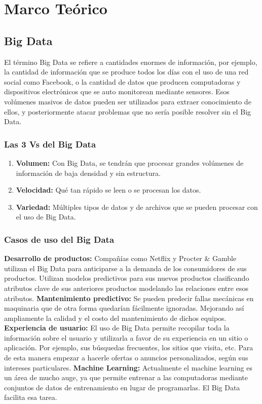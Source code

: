 \hypertarget{seccion:IniciarSesion}{\vspace{1pt}}
\section{Marco Teórico}

\subsection{Big Data}
El término Big Data se refiere a cantidades enormes de información, por ejemplo, la cantidad de información que se produce todos los días con el uso de una red social como Facebook, o la cantidad de datos que producen computadoras y dispositivos electrónicos que se auto monitorean mediante sensores. Esos volúmenes masivos de datos pueden ser utilizados para extraer conocimiento de ellos, y posteriormente atacar problemas que no sería posible resolver sin el Big Data.

\subsubsection{Las 3 Vs del Big Data}

\begin{enumerate}
	\item \textbf{Volumen:} Con Big Data, se tendrán que procesar grandes volúmenes de información de baja densidad y sin estructura.
	\item \textbf{Velocidad:} Qué tan rápido se leen o se procesan los datos.
	\item \textbf{Variedad:} Múltiples tipos de datos y de archivos que se pueden procesar con el uso de Big Data.
\end{enumerate}

\subsubsection{Casos de uso del Big Data}

\begin{UClist}
	\UCli \textbf{Desarrollo de productos:} Compañías como Netflix y Procter \& Gamble utilizan el Big Data para anticiparse a la demanda de los consumidores de sus productos. Utilizan modelos predictivos para sus nuevos productos clasificando atributos clave de sus anteriores productos modelando las relaciones entre esos atributos.
	\UCli \textbf{Mantenimiento predictivo:} Se pueden predecir fallas mecánicas en maquinaria que de otra forma quedarían fácilmente ignoradas. Mejorando así ampliamente la calidad y el costo del mantenimiento de dichos equipos.
	\UCli \textbf{Experiencia de usuario:} El uso de Big Data permite recopilar toda la información sobre el usuario y utilizarla a favor de su experiencia en un sitio o aplicación. Por ejemplo, sus búsquedas frecuentes, los sitios que visita, etc. Para de esta manera empezar a hacerle ofertas o anuncios personalizados, según sus intereses particulares.
	\UCli \textbf{Machine Learning:} Actualmente el machine learning es un área de mucho auge, ya que permite entrenar a las computadoras mediante conjuntos de datos de entrenamiento en lugar de programarlas. El Big Data facilita esa tarea.
\end{UClist}

